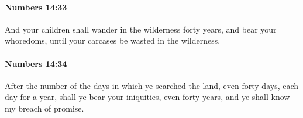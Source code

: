 		\paragraph{Numbers 14:33} %
			\label{NUMBERS-14-33}

			And your children shall wander in the wilderness forty years, and bear your whoredoms, until your carcases be wasted in the wilderness.


		\paragraph{Numbers 14:34} %
			\label{NUMBERS-14-34}

			After the number of the days in which ye searched the land, even forty days, each day for a year, shall ye bear your iniquities, even forty years, and ye shall know my breach of promise.


